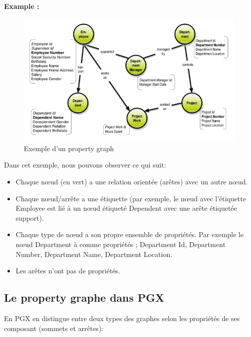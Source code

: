 \newpage
\textbf{Example :}
\begin{figure}[h!]  
  \centering
    \includegraphics[width=1\textwidth]{chapitre2/Figures/PropertyGraphExample.PNG}
  \caption{Exemple d'un property graph}
\end{figure}

Dans cet exemple, nous pouvons observer ce qui suit:

\begin{itemize}[label=\textbullet]
\item  Chaque nœud (en vert) a une relation orientée (arêtes) avec un autre nœud.
\item  Chaque nœud/arrête a une étiquette (par exemple, le nœud avec l'étiquette Employee est lié à un nœud étiqueté Dependent avec une arête étiquetée support).
\item  Chaque type de nœud a son propre ensemble de propriétés. Par exemple le nœud Department à comme propriétés ; {Department Id, Department Number, Department  Name, Department Location}.
\item  Les arêtes n'ont pas de propriétés.
\end{itemize}

\subsection{Le property graphe dans PGX}
En PGX en distingue entre deux types des graphes selon les propriétés de ses composant (sommets et arrêtes):

